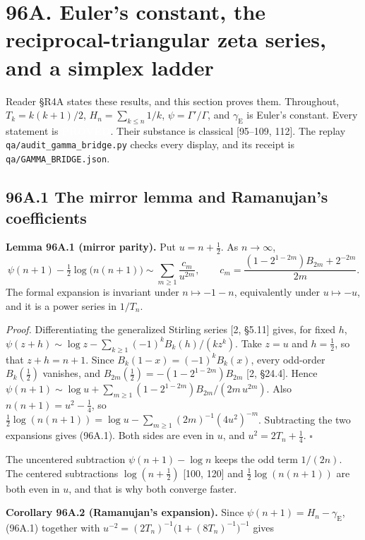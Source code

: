 \documentclass[
  11pt,
]{book}
\newcommand{\tnstatusbox}[2]{%
  {\setlength{\fboxsep}{2.1pt}%
   \colorbox{#1}{\textcolor{white}{\scriptsize\bfseries\hspace{0.5pt}#2\hspace{0.5pt}}}}}
\newcommand{\PROVED}{\tnstatusbox{tngreen}{PROVED}}
\renewenvironment{quote}
  {\begin{tcolorbox}[
      enhanced,
      breakable,
      colback=tncream,
      colframe=tnrust,
      boxrule=0.8pt,
      arc=1.5pt,
      left=7pt,
      right=7pt,
      top=6pt,
      bottom=6pt]}
  {\end{tcolorbox}}
\begin{document}
\section{96A. Euler's constant, the reciprocal-triangular zeta series,
and a simplex
ladder}\label{a.-eulers-constant-the-reciprocal-triangular-zeta-series-and-a-simplex-ladder}

Reader §R4A states these results, and this section proves them.
Throughout, \(T_k=k(k+1)/2\), \(H_n=\sum_{k\le n}1/k\),
\(\psi=\Gamma'/\Gamma\), and \(\gamma_{\mathrm E}\) is Euler's constant.
Every statement is \PROVED{}. Their substance is classical {[}95--109,
112{]}. The replay \texttt{qa/audit\_gamma\_bridge.py} checks every
display, and its receipt is \texttt{qa/GAMMA\_BRIDGE.json}.

\subsection{96A.1 The mirror lemma and Ramanujan's
coefficients}\label{a.1-the-mirror-lemma-and-ramanujans-coefficients}

\begin{quote}
\textbf{Lemma 96A.1 (mirror parity).} Put \(u=n+\tfrac12\). As
\(n\to\infty\), \[
\psi(n+1)-\tfrac12\log\bigl(n(n+1)\bigr)\sim\sum_{m\ge1}\frac{c_m}{u^{2m}},
\qquad
c_m=\frac{(1-2^{1-2m})B_{2m}+2^{-2m}}{2m}.
\tag{96A.1}
\] The formal expansion is invariant under \(n\mapsto-1-n\),
equivalently under \(u\mapsto-u\), and it is a power series in
\(1/T_n\).
\end{quote}

\emph{Proof.} Differentiating the generalized Stirling series {[}2,
§5.11{]} gives, for fixed \(h\),
\(\psi(z+h)\sim\log z-\sum_{k\ge1}(-1)^kB_k(h)/(kz^k)\). Take \(z=u\)
and \(h=\tfrac12\), so that \(z+h=n+1\). Since
\(B_k(1-x)=(-1)^kB_k(x)\), every odd-order \(B_k(\tfrac12)\) vanishes,
and \(B_{2m}(\tfrac12)=-(1-2^{1-2m})B_{2m}\) {[}2, §24.4{]}. Hence
\(\psi(n+1)\sim\log u+\sum_{m\ge1}(1-2^{1-2m})B_{2m}/(2m\,u^{2m})\).
Also \(n(n+1)=u^2-\tfrac14\), so
\(\tfrac12\log(n(n+1))=\log u-\sum_{m\ge1}(2m)^{-1}(4u^2)^{-m}\).
Subtracting the two expansions gives (96A.1). Both sides are even in
\(u\), and \(u^2=2T_n+\tfrac14\). \(\square\)

The uncentered subtraction \(\psi(n+1)-\log n\) keeps the odd term
\(1/(2n)\). The centered subtractions \(\log(n+\tfrac12)\) {[}100,
120{]} and \(\tfrac12\log(n(n+1))\) are both even in \(u\), and that is
why both converge faster.

\textbf{Corollary 96A.2 (Ramanujan's expansion).} Since
\(\psi(n+1)=H_n-\gamma_{\mathrm E}\), (96A.1) together with
\(u^{-2}=(2T_n)^{-1}\bigl(1+(8T_n)^{-1}\bigr)^{-1}\) gives
\end{document}

